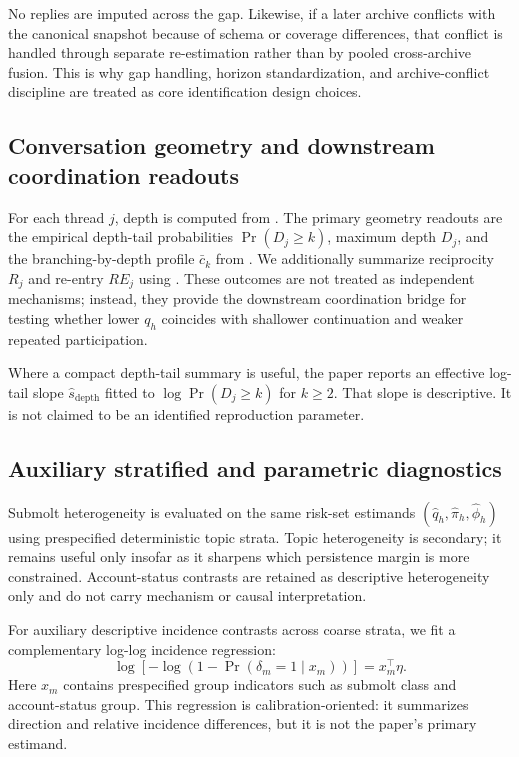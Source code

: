 No replies are imputed across the gap. Likewise, if a later archive conflicts
with the canonical snapshot because of schema or coverage differences, that
conflict is handled through separate re-estimation rather than by pooled
cross-archive fusion. This is why gap handling, horizon standardization, and
archive-conflict discipline are treated as core identification design choices.

\subsection{Conversation geometry and downstream coordination readouts}
\label{sec:methods:geometry}

For each thread \(j\), depth is computed from . The primary
geometry readouts are the empirical depth-tail probabilities
\(\Pr(D_j\ge k)\), maximum depth \(D_j\), and the branching-by-depth profile
\(\bar c_k\) from . We additionally summarize
reciprocity \(R_j\) and re-entry \(RE_j\) using
. These outcomes are not treated as
independent mechanisms; instead, they provide the downstream coordination bridge
for testing whether lower \(q_h\) coincides with shallower continuation and
weaker repeated participation.

Where a compact depth-tail summary is useful, the paper reports an effective
log-tail slope \(\hat s_{\mathrm{depth}}\) fitted to
\(\log \Pr(D_j\ge k)\) for \(k\ge 2\). That slope is descriptive. It is not
claimed to be an identified reproduction parameter.

\subsection{Auxiliary stratified and parametric diagnostics}
\label{sec:methods:auxiliary}

Submolt heterogeneity is evaluated on the same risk-set estimands
\((\widehat q_h,\widehat \pi_h,\widehat \phi_h)\) using prespecified
deterministic topic strata. Topic heterogeneity is secondary; it remains useful
only insofar as it sharpens which persistence margin is more constrained.
Account-status contrasts are retained as descriptive heterogeneity only and do
not carry mechanism or causal interpretation.

For auxiliary descriptive incidence contrasts across coarse strata, we fit a
complementary log-log incidence regression:
\begin{equation}
\label{eq:methods-incidence-cloglog}
\log\!\left[-\log\!\left(1-\Pr(\delta_m=1\mid x_m)\right)\right]
=
x_m^{\top}\eta.
\end{equation}
Here \(x_m\) contains prespecified group indicators such as submolt class and
account-status group. This regression is calibration-oriented: it summarizes
direction and relative incidence differences, but it is not the paper's primary
estimand.

